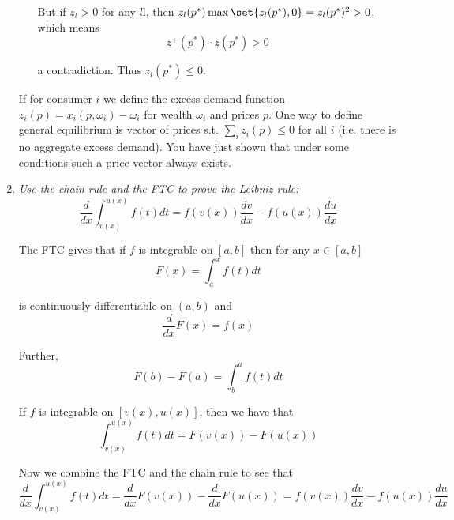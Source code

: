 \documentclass{article}
\begin{document}
\begin{enumerate}[1.]
\begin{enumerate}[a)]
        But if $z_l > 0$ for any $l$l, then $z_l(p^*) \max\set{z_l(p^*), 0} = z_l(p^*)^2 > 0$, which means
        \[
          z^+(p^*) \cdot z(p^*) > 0
        \]

        a contradiction. Thus $z_l(p^*) \le 0$.
    \end{enumerate}

  \begin{remark}
    If for consumer $i$ we define the excess demand function $z_i(p) = x_i(p, \omega_i) - \omega_i$ for wealth $\omega_i$ and prices $p$. One way to define general equilibrium is vector of prices s.t. $\sum^{}_{i} z_i(p) \le 0$ for all $i$ (i.e. there is no aggregate excess demand). You have just shown that under some conditions such a price vector always exists.
  \end{remark}

  \item \textit{Use the chain rule and the FTC to prove the Leibniz rule:}
    \[
      \dfrac{d}{dx} \int_{v(x)}^{u(x)} f(t) dt
      =
      f(v(x)) \dfrac{dv}{dx}
      - f(u(x)) \dfrac{du}{dx}
    \]

    \solution The FTC gives that if $f$ is integrable on $[a, b]$ then for any $x \in [a, b]$
    \[
      F(x) = \int_{a}^{x} f(t) dt
    \]

    is continuously differentiable on $(a, b)$ and
    \[
      \dfrac{d}{dx} F(x) = f(x)
    \]

    Further,
    \[
      F(b) - F(a) = \int_{b}^{a} f(t) dt
    \]

    If $f$ is integrable on $[v(x), u(x)]$, then we have that
    \[
      \int_{v(x)}^{u(x)} f(t) dt
      =
      F(v(x)) - F(u(x))
    \]

    Now we combine the FTC and the chain rule to see that
    \[
      \dfrac{d}{dx} \int_{v(x)}^{u(x)} f(t) dt
      =
      \dfrac{d}{dx} F(v(x)) - \dfrac{d}{dx} F(u(x))
      =
      f(v(x)) \dfrac{dv}{dx} - f(u(x)) \dfrac{du}{dx}
    \]
\end{enumerate}

\end{document}
